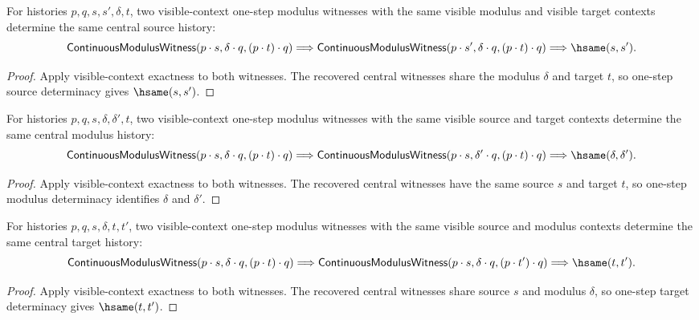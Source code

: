 \begin{theorem}
\label{thm:continuous-modulus-witness-visible-context-source-deterministic}
For histories $p,q,s,s',\delta,t$, two visible-context one-step modulus
witnesses with the same visible modulus and visible target contexts determine
the same central source history:
$$
\mathsf{ContinuousModulusWitness}(p\cdot s,\delta\cdot q,(p\cdot t)\cdot q)
\Longrightarrow
\mathsf{ContinuousModulusWitness}(p\cdot s',\delta\cdot q,(p\cdot t)\cdot q)
\Longrightarrow
\hsame(s,s').
$$
\end{theorem}
\begin{proof}
Apply visible-context exactness to both witnesses. The recovered central
witnesses share the modulus $\delta$ and target $t$, so one-step source
determinacy gives $\hsame(s,s')$.
\end{proof}

\begin{theorem}
\label{thm:continuous-modulus-witness-visible-context-modulus-deterministic}
For histories $p,q,s,\delta,\delta',t$, two visible-context one-step modulus
witnesses with the same visible source and target contexts determine the same
central modulus history:
$$
\mathsf{ContinuousModulusWitness}(p\cdot s,\delta\cdot q,(p\cdot t)\cdot q)
\Longrightarrow
\mathsf{ContinuousModulusWitness}(p\cdot s,\delta'\cdot q,(p\cdot t)\cdot q)
\Longrightarrow
\hsame(\delta,\delta').
$$
\end{theorem}
\begin{proof}
Apply visible-context exactness to both witnesses. The recovered central
witnesses have the same source $s$ and target $t$, so one-step modulus
determinacy identifies $\delta$ and $\delta'$.
\end{proof}

\begin{theorem}
\label{thm:continuous-modulus-witness-visible-context-target-deterministic}
For histories $p,q,s,\delta,t,t'$, two visible-context one-step modulus
witnesses with the same visible source and modulus contexts determine the same
central target history:
$$
\mathsf{ContinuousModulusWitness}(p\cdot s,\delta\cdot q,(p\cdot t)\cdot q)
\Longrightarrow
\mathsf{ContinuousModulusWitness}(p\cdot s,\delta\cdot q,(p\cdot t')\cdot q)
\Longrightarrow
\hsame(t,t').
$$
\end{theorem}
\begin{proof}
Apply visible-context exactness to both witnesses. The recovered central
witnesses share source $s$ and modulus $\delta$, so one-step target
determinacy gives $\hsame(t,t')$.
\end{proof}

